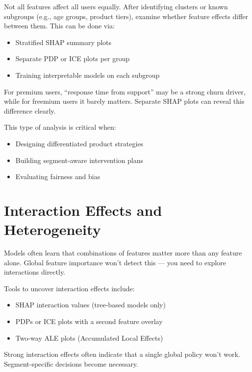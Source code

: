 \documentclass[12pt,openany]{book}
\begin{document}
Not all features affect all users equally. After identifying clusters or known subgroups (e.g., age groups, product tiers), examine whether feature effects differ between them. This can be done via:
\begin{itemize}
  \item Stratified SHAP summary plots
  \item Separate PDP or ICE plots per group
  \item Training interpretable models on each subgroup
\end{itemize}

\begin{examplebox}
For premium users, ``response time from support'' may be a strong churn driver, while for freemium users it barely matters. Separate SHAP plots can reveal this difference clearly.
\end{examplebox}

This type of analysis is critical when:
\begin{itemize}
  \item Designing differentiated product strategies
  \item Building segment-aware intervention plans
  \item Evaluating fairness and bias
\end{itemize}

\section{Interaction Effects and Heterogeneity}

Models often learn that combinations of features matter more than any feature alone. Global feature importance won’t detect this — you need to explore interactions directly.

Tools to uncover interaction effects include:
\begin{itemize}
  \item SHAP interaction values (tree-based models only)
  \item PDPs or ICE plots with a second feature overlay
  \item Two-way ALE plots (Accumulated Local Effects)
\end{itemize}

\begin{notebox}
Strong interaction effects often indicate that a single global policy won't work. Segment-specific decisions become necessary.
\end{notebox}
\end{document}
